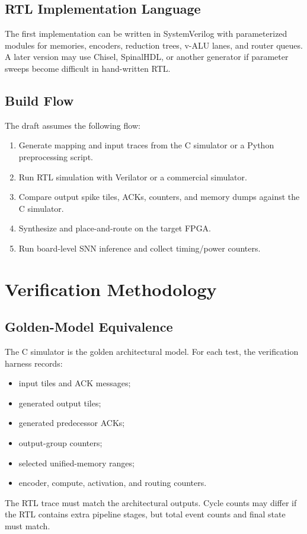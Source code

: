 \documentclass[10pt,conference]{IEEEtran}
\begin{document}
\subsection{RTL Implementation Language}
The first implementation can be written in SystemVerilog with parameterized modules for memories, encoders, reduction trees, v-ALU lanes, and router queues. A later version may use Chisel, SpinalHDL, or another generator if parameter sweeps become difficult in hand-written RTL.

\subsection{Build Flow}
The draft assumes the following flow:
\begin{enumerate}
    \item Generate mapping and input traces from the C simulator or a Python preprocessing script.
    \item Run RTL simulation with Verilator or a commercial simulator.
    \item Compare output spike tiles, ACKs, counters, and memory dumps against the C simulator.
    \item Synthesize and place-and-route on the target FPGA.
    \item Run board-level SNN inference and collect timing/power counters.
\end{enumerate}

\section{Verification Methodology}
\subsection{Golden-Model Equivalence}
The C simulator is the golden architectural model. For each test, the verification harness records:
\begin{itemize}
    \item input tiles and ACK messages;
    \item generated output tiles;
    \item generated predecessor ACKs;
    \item output-group counters;
    \item selected unified-memory ranges;
    \item encoder, compute, activation, and routing counters.
\end{itemize}
The RTL trace must match the architectural outputs. Cycle counts may differ if the RTL contains extra pipeline stages, but total event counts and final state must match.
\end{document}
